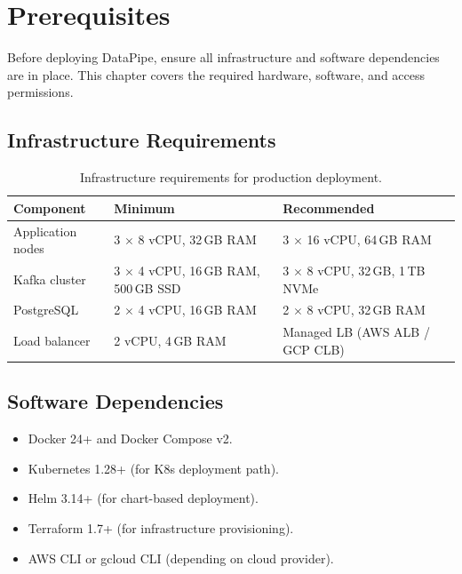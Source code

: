 \documentclass[
    language=english,
    doctype=manual,
    institution=none,
    titlestyle=book,
    oneside,
]{../../omnilatex}
\begin{document}
\maketitle

\tableofcontents

\chapter{Prerequisites}
\label{sec:prerequisites}

Before deploying DataPipe, ensure all infrastructure and software
dependencies are in place. This chapter covers the required hardware,
software, and access permissions.

\section{Infrastructure Requirements}

\begin{table}[htbp]
    \centering
    \caption{Infrastructure requirements for production deployment.}
    \label{tab:infra}
    \begin{tabular}{@{}lll@{}}
        \toprule
        Component & Minimum & Recommended \\
        \midrule
        Application nodes & 3 $\times$ 8 vCPU, 32\,GB RAM &
            3 $\times$ 16 vCPU, 64\,GB RAM \\
        Kafka cluster & 3 $\times$ 4 vCPU, 16\,GB RAM, 500\,GB SSD &
            3 $\times$ 8 vCPU, 32\,GB, 1\,TB NVMe \\
        PostgreSQL & 2 $\times$ 4 vCPU, 16\,GB RAM &
            2 $\times$ 8 vCPU, 32\,GB RAM \\
        Load balancer & 2 vCPU, 4\,GB RAM &
            Managed LB (AWS ALB / GCP CLB) \\
        \bottomrule
    \end{tabular}
\end{table}

\section{Software Dependencies}

\begin{itemize}
    \item Docker 24+ and Docker Compose v2.
    \item Kubernetes 1.28+ (for K8s deployment path).
    \item Helm 3.14+ (for chart-based deployment).
    \item Terraform 1.7+ (for infrastructure provisioning).
    \item AWS CLI or gcloud CLI (depending on cloud provider).
\end{itemize}
\end{document}
